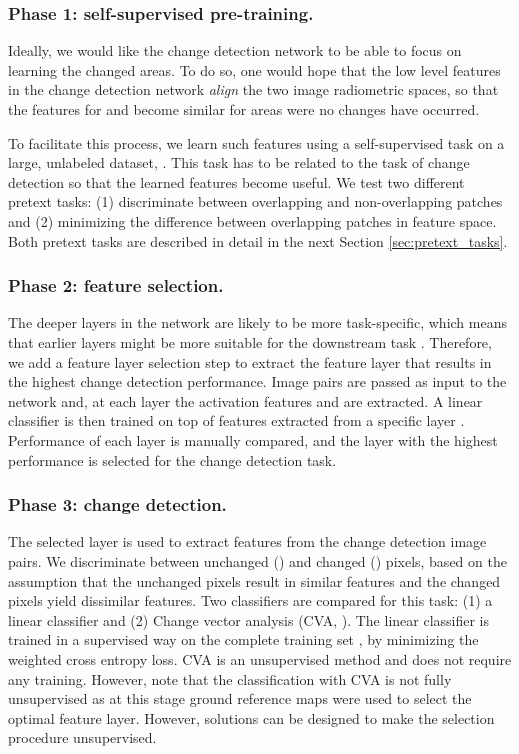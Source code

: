 \documentclass[runningheads]{llncs}
\begin{document}
\subsubsection{Phase 1: self-supervised pre-training.} Ideally, we would like the change detection network to be able to focus on learning the changed areas. To do so, one would hope that the low level features in the change detection network \emph{align} the two image radiometric spaces, so that
the {features} for  and  become similar for areas were no changes have occurred. 

To facilitate this process, we learn such features using a self-supervised task on a large, unlabeled dataset, . {This task has to be related to the task of change detection so that the learned features become useful.}
We test two different pretext tasks:  (1) discriminate between overlapping and non-overlapping patches and (2) minimizing the  difference between overlapping patches in  feature space. Both pretext tasks are described in detail in the next Section \ref{sec:pretext_tasks}.

\subsubsection{Phase 2: feature selection.} 
The deeper layers in the network are likely to be more task-specific, which means that earlier layers might be more suitable for the downstream task \cite{Gidaris:2018:self-supervised_rotation}. Therefore, we add a feature layer selection step to extract the feature layer that results in the highest change detection performance. Image pairs  are passed as input to the network and, at each layer the activation features  and  are extracted. {A linear classifier is} then trained on top of features extracted from a specific layer . 
Performance of each layer is manually compared, and the layer with the highest performance is selected for the change detection task. 

\subsubsection{Phase 3: change detection.} 
The selected layer is used to extract features from the change detection image pairs. We discriminate between unchanged () and changed () pixels, based on the assumption that the unchanged pixels result in similar features and the changed pixels yield dissimilar features. Two classifiers are compared for this task: (1) a linear classifier and (2) Change vector analysis ({CVA}, \cite{Bovolo:2015:time_cd}). The linear classifier is trained in a supervised way on the complete training set , by minimizing the weighted cross entropy loss. {CVA} is an unsupervised method and does not require any training. However, note that the classification with {CVA} is not fully unsupervised as {at this stage} ground reference maps were used to select the optimal feature layer. {However, solutions can be designed to make the selection procedure unsupervised.}  \newline \newline 
\end{document}
